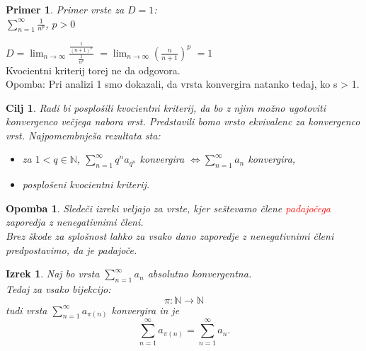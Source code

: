 \documentclass{beamer}
\newtheorem{izrek}{Izrek}
\newtheorem{cilj}{Cilj}
\newtheorem{opomba}{Opomba}
\newtheorem{primer}{Primer}
\def\N{\mathbb{N}} %
\begin{document}
\begin{frame}
    \begin{primer}{Primer vrste za $D = 1$}: \\
       $\sum_{n = 1}^{\infty}{\frac{1}{n^p}}$, $p > 0$
    \end{primer}
    
    \vspace{\baselineskip}
    \pause
    $D = \lim_{n \to \infty} \frac{\frac{1}{(n+1)^p}}{\frac{1}{n^p}}$
    $= \lim_{n \to \infty} (\frac{n}{n + 1})^p$ 
    $= 1$
    \pause
    \vspace{\baselineskip}\\
    Kvocientni kriterij torej ne da odgovora.\\
    Opomba: Pri analizi 1 smo dokazali, da vrsta konvergira natanko tedaj, ko s > 1.
\end{frame}
\begin{frame}
    \begin{cilj}
        Radi bi posplošili \emph{kvocientni kriterij}, da bo z njim možno ugotoviti konvergenco večjega nabora vrst.
        Predstavili bomo vrsto ekvivalenc za konvergenco vrst. Najpomembnješa rezultata sta:
        \begin{itemize}
            \item za $ 1 < q \in {\mathbb{N}}$, $\sum_{n = 1}^{\infty}{q^na_{q^n}}$ konvergira $\iff \sum_{n = 1}^{\infty}{a_{n}}$ konvergira, \\
            \item posplošeni kvocientni kriterij.
        \end{itemize} 
    \end{cilj}
\end{frame}

\begin{frame}
    \begin{opomba}
        Sledeči izreki veljajo za vrste, kjer seštevamo člene \textcolor{red}{padajočega} zaporedja z nenegativnimi členi.\\
        Brez škode za splošnost lahko za vsako dano zaporedje z nenegativnimi členi predpostavimo, da je padajoče.
        
    \end{opomba}

    \pause
    \begin{izrek}
        Naj bo vrsta $\sum_{n = 1}^{\infty}{a_n}$ absolutno konvergentna.\\
        Tedaj za vsako bijekcijo:
        \[
            \pi: \N \rightarrow \N 
        \]
        tudi vrsta $\sum_{n = 1}^{\infty}{a_{\pi(n)}}$ konvergira in je 
        \[
            \sum_{n = 1}^{\infty}{a_{\pi(n)}} = \sum_{n = 1}^{\infty}{a_n} \text{.}
        \]
    \end{izrek}
\end{frame}
\end{document}
